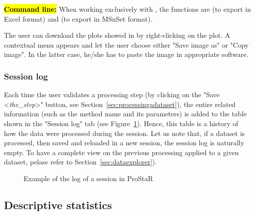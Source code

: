 \documentclass[12pt]{article}
\begin{document}

\hl{\bf Command line:} When working exclusively with , the functions are  (to export in Excel format) and  (to export in MSnSet format).


{The user can download the plots showed in  by right-clicking on the plot. A contextual menu appears and let the user choose either "Save image as" or "Copy image". In the latter case, he/she has to paste the image in appropriate software.}

\subsubsection{Session log}\label{sec:sessionlog}

Each time the user validates a processing step (by clicking on the "Save <\emph{the\_step}>" button, see Section~\ref{sec:processingadataset}), the entire related information  (such as the method name and its parameters) is added to the table shown in the "Session log" tab (see Figure~\ref{fig:sessionlog}). Hence, this table is a history of how the data were processed during the session. 
Let us note that, if a dataset is processed, then saved and reloaded in a new session, the session log is naturally empty. To have a complete view on the previous processing applied to a given dataset, pelase refer to Section~\ref{sec:dataexplorer}).

\begin{figure}[b]
\centering
{}
\caption{Example of the log of a session in ProStaR}\label{fig:sessionlog}
\end {figure}

\subsection{Descriptive statistics}\label{sec:descriptivestatistics}
\end{document}
